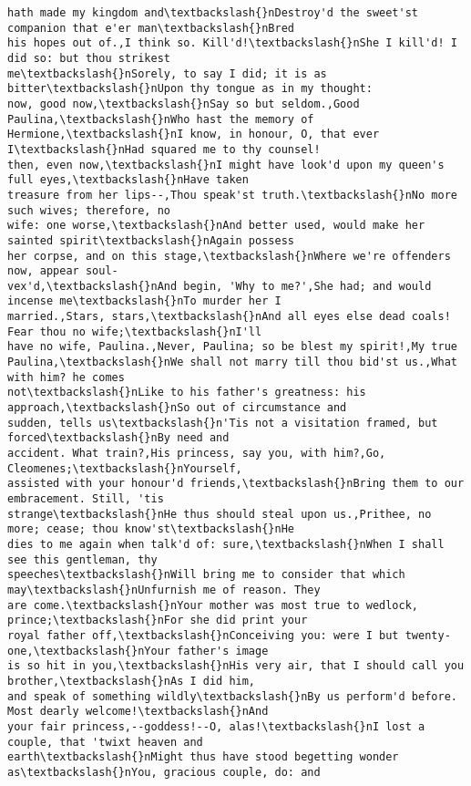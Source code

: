 \documentclass[11pt]{article}
\begin{document}
\begin{tcolorbox}[breakable, size=fbox, boxrule=.5pt, pad at break*=1mm, opacityfill=0]
\begin{Verbatim}[commandchars=\\\{\}]
hath made my kingdom and\textbackslash{}nDestroy'd the sweet'st companion that e'er man\textbackslash{}nBred
his hopes out of.,I think so. Kill'd!\textbackslash{}nShe I kill'd! I did so: but thou strikest
me\textbackslash{}nSorely, to say I did; it is as bitter\textbackslash{}nUpon thy tongue as in my thought:
now, good now,\textbackslash{}nSay so but seldom.,Good Paulina,\textbackslash{}nWho hast the memory of
Hermione,\textbackslash{}nI know, in honour, O, that ever I\textbackslash{}nHad squared me to thy counsel!
then, even now,\textbackslash{}nI might have look'd upon my queen's full eyes,\textbackslash{}nHave taken
treasure from her lips--,Thou speak'st truth.\textbackslash{}nNo more such wives; therefore, no
wife: one worse,\textbackslash{}nAnd better used, would make her sainted spirit\textbackslash{}nAgain possess
her corpse, and on this stage,\textbackslash{}nWhere we're offenders now, appear soul-
vex'd,\textbackslash{}nAnd begin, 'Why to me?',She had; and would incense me\textbackslash{}nTo murder her I
married.,Stars, stars,\textbackslash{}nAnd all eyes else dead coals! Fear thou no wife;\textbackslash{}nI'll
have no wife, Paulina.,Never, Paulina; so be blest my spirit!,My true
Paulina,\textbackslash{}nWe shall not marry till thou bid'st us.,What with him? he comes
not\textbackslash{}nLike to his father's greatness: his approach,\textbackslash{}nSo out of circumstance and
sudden, tells us\textbackslash{}n'Tis not a visitation framed, but forced\textbackslash{}nBy need and
accident. What train?,His princess, say you, with him?,Go, Cleomenes;\textbackslash{}nYourself,
assisted with your honour'd friends,\textbackslash{}nBring them to our embracement. Still, 'tis
strange\textbackslash{}nHe thus should steal upon us.,Prithee, no more; cease; thou know'st\textbackslash{}nHe
dies to me again when talk'd of: sure,\textbackslash{}nWhen I shall see this gentleman, thy
speeches\textbackslash{}nWill bring me to consider that which may\textbackslash{}nUnfurnish me of reason. They
are come.\textbackslash{}nYour mother was most true to wedlock, prince;\textbackslash{}nFor she did print your
royal father off,\textbackslash{}nConceiving you: were I but twenty-one,\textbackslash{}nYour father's image
is so hit in you,\textbackslash{}nHis very air, that I should call you brother,\textbackslash{}nAs I did him,
and speak of something wildly\textbackslash{}nBy us perform'd before. Most dearly welcome!\textbackslash{}nAnd
your fair princess,--goddess!--O, alas!\textbackslash{}nI lost a couple, that 'twixt heaven and
earth\textbackslash{}nMight thus have stood begetting wonder as\textbackslash{}nYou, gracious couple, do: and

\end{Verbatim}
\end{tcolorbox}
\end{document}
